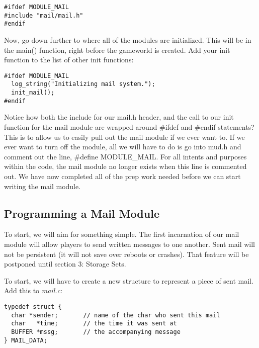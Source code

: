\documentclass[12pt]{article}
\begin{document}
{\bf \begin{verbatim}
#ifdef MODULE_MAIL
#include "mail/mail.h"
#endif
\end{verbatim}}

Now, go down further to where all of the modules are initialized. This will be in the main() function, right before the gameworld is created. Add your init function to the list of other init functions:

{\bf \begin{verbatim}
#ifdef MODULE_MAIL
  log_string("Initializing mail system.");
  init_mail();
#endif
\end{verbatim}}

Notice how both the include for our mail.h header, and the call to our init function for the mail module are wrapped around \#ifdef and \#endif statements? This is to allow us to easily pull out the mail module if we ever want to. If we ever want to turn off the module, all we will have to do is go into mud.h and comment out the line, \#define MODULE\_MAIL. For all intents and purposes within the code, the mail module no longer exists when this line is commented out. We have now completed all of the prep work needed before we can start writing the mail module.



\subsection{Programming a Mail Module}
To start, we will aim for something simple. The first incarnation of our mail module will allow players to send written messages to one another. Sent mail will not be persistent (it will not save over reboots or crashes). That feature will be postponed until section 3: Storage Sets.

To start, we will have to create a new structure to represent a piece of sent mail. Add this to {\it mail.c}:

{\bf \begin{verbatim}
typedef struct {
  char *sender;       // name of the char who sent this mail
  char   *time;       // the time it was sent at
  BUFFER *mssg;       // the accompanying message
} MAIL_DATA;
\end{verbatim}}
\end{document}
